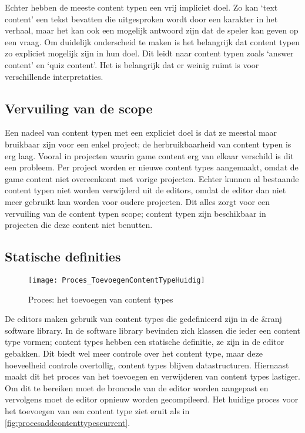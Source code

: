 Echter hebben de meeste content typen een vrij impliciet doel. Zo kan ‘text content’ een tekst bevatten die uitgesproken wordt door een karakter in het verhaal, maar het kan ook een mogelijk antwoord zijn dat de speler kan geven op een vraag. Om duidelijk onderscheid te maken is het belangrijk dat content typen zo expliciet mogelijk zijn in hun doel. Dit leidt naar content typen zoals ‘answer content’ en ‘quiz content’. Het is belangrijk dat er weinig ruimt is voor verschillende interpretaties.

\subsection{Vervuiling van de scope}
Een nadeel van content typen met een expliciet doel is dat ze meestal maar bruikbaar zijn voor een enkel project; de herbruikbaarheid van content typen is erg laag. Vooral in projecten waarin game content erg van elkaar verschild is dit een probleem. Per project worden er nieuwe content types aangemaakt, omdat de game content niet overeenkomt met vorige projecten. Echter kunnen al bestaande content typen niet worden verwijderd uit de editors, omdat de editor dan niet meer gebruikt kan worden voor oudere projecten. Dit alles zorgt voor een vervuiling van de content typen scope; content typen zijn beschikbaar in projecten die deze content niet benutten.

\pagebreak

\subsection{Statische definities}
\begin{wrapfigure}{r}{0.4\textwidth}
    \texttt{[image: Proces\_ToevoegenContentTypeHuidig]}
    \caption{Proces: het toevoegen van content types}
    \label{fig:procesaddcontenttypescurrent}
    \centering
\end{wrapfigure}
De editors maken gebruik van content types die gedefinieerd zijn in de \&ranj software library. In de software library bevinden zich klassen die ieder een content type vormen; content types hebben een statische definitie, ze zijn in de editor gebakken. Dit biedt wel meer controle over het content type, maar deze hoeveelheid controle overtollig, content types blijven datastructuren. Hiernaast maakt dit het proces van het toevoegen en verwijderen van content types lastiger. Om dit te bereiken moet de broncode van de editor worden aangepast en vervolgens moet de editor opnieuw worden gecompileerd. Het huidige proces voor het toevoegen van een content type ziet eruit als in \autoref{fig:procesaddcontenttypescurrent}.

